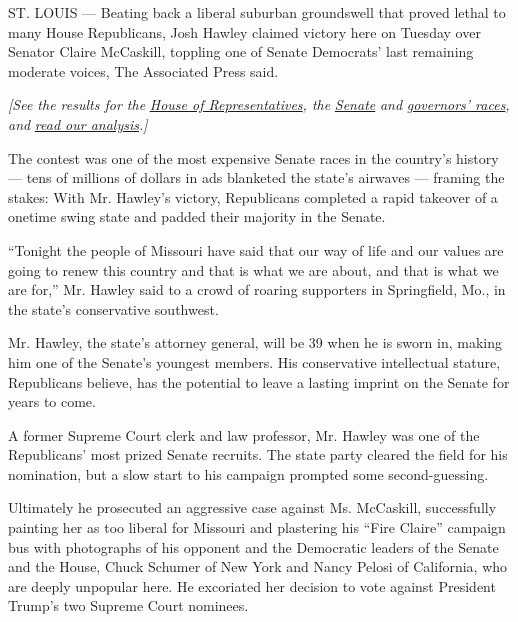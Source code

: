 ST. LOUIS --- Beating back a liberal suburban groundswell that proved
lethal to many House Republicans, Josh Hawley claimed victory here on
Tuesday over Senator Claire McCaskill, toppling one of Senate Democrats'
last remaining moderate voices, The Associated Press said.

\emph{{[}See the results for the}
\emph{\href{https://www.nytimes.com/interactive/2018/11/06/us/elections/results-house-elections.html?action=click\&module=Spotlight\&pgtype=Homepage}{House
of Representatives}, the}
\emph{\href{https://www.nytimes.com/interactive/2018/11/06/us/elections/results-senate-elections.html}{Senate}}
\emph{and}
\emph{\href{https://www.nytimes.com/interactive/2018/11/06/us/elections/results-governor-elections.html?action=click\&module=Intentional\&pgtype=Article}{governors'
races}, and}
\emph{\href{https://www.nytimes.com/2018/11/06/us/politics/midterm-elections-results.html}{read
our analysis}.{]}}

The contest was one of the most expensive Senate races in the country's
history --- tens of millions of dollars in ads blanketed the state's
airwaves --- framing the stakes: With Mr. Hawley's victory, Republicans
completed a rapid takeover of a onetime swing state and padded their
majority in the Senate.

``Tonight the people of Missouri have said that our way of life and our
values are going to renew this country and that is what we are about,
and that is what we are for,'' Mr. Hawley said to a crowd of roaring
supporters in Springfield, Mo., in the state's conservative southwest.

Mr. Hawley, the state's attorney general, will be 39 when he is sworn
in, making him one of the Senate's youngest members. His conservative
intellectual stature, Republicans believe, has the potential to leave a
lasting imprint on the Senate for years to come.

A former Supreme Court clerk and law professor, Mr. Hawley was one of
the Republicans' most prized Senate recruits. The state party cleared
the field for his nomination, but a slow start to his campaign prompted
some second-guessing.

Ultimately he prosecuted an aggressive case against Ms. McCaskill,
successfully painting her as too liberal for Missouri and plastering his
``Fire Claire'' campaign bus with photographs of his opponent and the
Democratic leaders of the Senate and the House, Chuck Schumer of New
York and Nancy Pelosi of California, who are deeply unpopular here. He
excoriated her decision to vote against President Trump's two Supreme
Court nominees.

